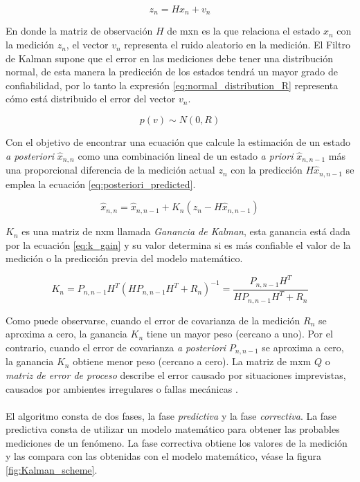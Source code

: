 \begin{equation}
z_n = Hx_n+v_n
\label{eq:measurement_equation}
\end{equation}

En donde la matriz de observación $H$ de mxn es la que relaciona el estado $x_n$ con la medición $z_n$, el vector $v_n$ representa el ruido aleatorio en la medición. El Filtro de Kalman supone que el error en las mediciones debe tener una distribución normal, de esta manera la predicción de los estados tendrá un mayor grado de confiabilidad, por lo tanto la expresión \ref{eq:normal_distribution_R} representa cómo está distribuido el error del vector $v_n$. 

\begin{equation}
p(v) \sim N(0,R)
\label{eq:normal_distribution_R}
\end{equation}

Con el objetivo de encontrar una ecuación que calcule la estimación de un estado \textit{a posteriori} $\hat{x}_{n,n}$ como una combinación lineal de un estado \textit{a priori} $\hat{x}_{n, n-1}$ más una proporcional diferencia de la medición actual $z_n$ con la predicción $H\hat{x}_{n,n-1}$ se emplea la ecuación \ref{eq:posteriori_predicted}.

\begin{equation}
\hat{x}_{n,n} = \hat{x}_{n,n-1} + K_n (z_n-H\hat{x}_{n,n-1})
\label{eq:posteriori_predicted}
\end{equation}

$K_n$ es una matriz de nxm llamada \textit{Ganancia de Kalman}, esta ganancia está dada por la ecuación \ref{eq:k_gain} y su valor determina si es más confiable el valor de la medición o la predicción previa del modelo matemático.

\begin{equation}
K_n = P_{n,n-1}H^T(HP_{n,n-1}H^T+R_n)^{-1} = \frac{P_{n,n-1}H^T}{HP_{n,n-1}H^T+R_n}
\label{eq:k_gain}
\end{equation}

Como puede observarse, cuando el error de covarianza de la medición $R_n$ se aproxima a cero, la ganancia $K_n$  tiene un mayor peso (cercano a uno). Por el contrario, cuando el error de covarianza \textit{a posteriori} $P_{n,n-1}$ se aproxima a cero, la ganancia $K_n$ obtiene menor peso (cercano a cero).
	La matriz de mxm $Q$ o \textit{matriz de error de proceso} describe el error causado por situaciones imprevistas, causados por ambientes irregulares o fallas mecánicas .	
\\
\\
	El algoritmo consta de dos fases, la fase \textit{predictiva} y la fase \textit{correctiva}. La fase predictiva consta de utilizar un modelo matemático para obtener las probables mediciones de un fenómeno. La fase correctiva obtiene los valores de la medición y las compara con las obtenidas con el modelo matemático, véase la figura \ref{fig:Kalman_scheme}.


